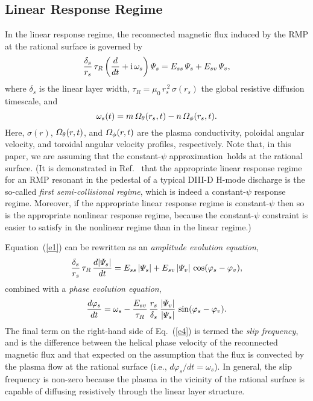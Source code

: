 \documentclass[12pt,prb,aps]{revtex4-1}
\begin{document}
\subsection{Linear Response Regime}
In the linear response regime, the reconnected magnetic flux induced by the RMP at the
rational surface is governed by\,\cite{rfa,rfb,rfc}
\begin{equation}\label{e1}
\frac{\delta_s}{r_s}\,\tau_R\left(\frac{d}{dt}+{\rm i}\,\omega_s\right){\mit\Psi}_s= E_{ss}\,{\mit\Psi}_s+E_{sv}\,{\mit\Psi}_v,
\end{equation}
where $\delta_s$ is the linear layer width, $\tau_R=\mu_0\,r_s^{\,2}\,\sigma(r_s)$ the global resistive diffusion timescale,
 and
\begin{equation}
\omega_s (t)=m\,{\mit\Omega}_\theta(r_s,t)-n\,{\mit\Omega}_\phi(r_s,t).
\end{equation}
Here, $\sigma(r)$, ${\mit\Omega}_\theta(r,t)$, and ${\mit\Omega}_\phi(r,t)$ are the 
plasma conductivity, poloidal angular velocity, and toroidal angular velocity profiles, respectively. 
Note that, in this paper, we are assuming that the constant-$\psi$ approximation\,\cite{fkr} holds at the rational surface. (It is demonstrated in
Ref.~ that the appropriate linear response regime for an RMP resonant in the pedestal of a typical DIII-D H-mode discharge
is the so-called  {\em first semi-collisional regime}, which is indeed a constant-$\psi$ response regime. Moreover, if the appropriate linear response regime
is constant-$\psi$ then so is the appropriate nonlinear response regime, because the constant-$\psi$ constraint is
easier to satisfy in the nonlinear regime than in the linear regime.\cite{rfb,rffig})

Equation~(\ref{e1}) can be rewritten as an {\em amplitude evolution equation},
\begin{equation}\label{e3}
\frac{\delta_s}{r_s}\,\tau_R\,\frac{d|{\mit\Psi}_s|}{dt}= E_{ss}\,|{\mit\Psi}_s| + E_{sv}\,|{\mit\Psi}_v|\,\cos(\varphi_s-\varphi_v),
\end{equation}
combined with a {\em phase evolution equation}, 
\begin{equation}\label{e4}
\frac{d\varphi_s}{dt} = \omega_s - \frac{E_{sv}}{\tau_R}\,\frac{r_s}{\delta_s}\,\frac{|{\mit\Psi}_v|}{|{\mit\Psi}_s|}\,\sin(\varphi_s-\varphi_v).
\end{equation}
The final term on the right-hand side of Eq.~(\ref{e4}) is termed the {\em slip frequency}, and is the difference between the helical phase velocity of
the reconnected magnetic flux and that expected on the  assumption that the flux is convected by the plasma flow at the
rational surface (i.e., $d\varphi_s/dt=\omega_s$). In general, the slip frequency is non-zero because the plasma in the vicinity of the rational surface is capable of diffusing resistively 
through the linear layer structure. 
\end{document}
